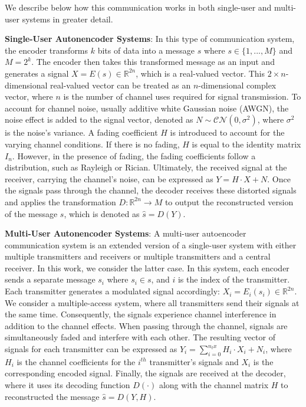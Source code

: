 We describe below how this communication works in both single-user and multi-user systems in greater detail.

\textbf{Single-User Autonencoder Systems}: In this type of communication system, the encoder transforms \(k\) bits of data into a message \(s\) where \(s \in \{1,...,M\}\) and \(M = 2^k\). The encoder then takes this transformed message as an input and generates a signal \(X = E(s) \in \mathbb{R}^{2n}\), which is a real-valued vector. This \(2 \times n\)-dimensional real-valued vector can be treated as an \(n\)-dimensional complex vector, where \(n\) is the number of channel uses required for signal transmission. To account for channel noise, usually additive white Gaussian noise (AWGN), the noise effect is added to the signal vector, denoted as \(N \sim \mathcal{CN}(0, \sigma^2)\), where \(\sigma^2\) is the noise's variance. A fading coefficient \(H\) is introduced to account for the varying channel conditions. If there is no fading, \(H\) is equal to the identity matrix \(I_n\). However, in the presence of fading, the fading coefficients follow a distribution, such as Rayleigh or Rician. Ultimately, the received signal at the receiver, carrying the channel's noise, can be expressed as \(Y = H \cdot X + N\). Once the signals pass through the channel, the decoder receives these distorted signals and applies the transformation \(D: \mathbb{R}^{2n} \rightarrow M \) to output the reconstructed version of the message \(s\), which is  denoted as \(\hat{s} = D(Y)\).

\textbf{Multi-User Autonencoder Systems}: A multi-user autoencoder communication system is an extended version of a single-user system with either multiple transmitters and receivers or multiple transmitters and a central receiver. In this work, we consider the latter case. In this system, each encoder sends a separate message \(s_i\) where \(s_i \in s\), and \(i\) is the index of the transmitter. Each transmitter generates a modulated signal accordingly: \(X_i = E_i(s_i) \in \mathbb{R}^{2n}\). We consider a multiple-access system, where all transmitters send their signals at the same time. Consequently, the signals experience channel interference in addition to the channel effects. When passing through the channel, signals are simultaneously faded and interfere with each other. The resulting vector of signals for each transmitter can be expressed as \(Y_i = \sum_{i=0}^{n_tx} H_i \cdot X_i + N_i\), where \(H_i\) is the channel coefficients for the \(i^{th}\) transmitter's signals and \(X_i\) is the corresponding encoded signal. Finally, the signals are received at the decoder, where it uses its decoding function \(D(\cdot)\) along with the channel matrix \(H\) to reconstructed the message \(\hat{s} = D(Y, H)\).
